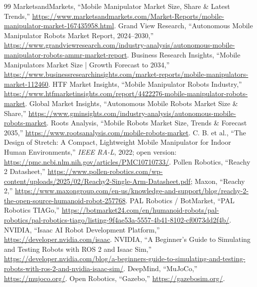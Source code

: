 \documentclass[11pt,a4paper]{article}
\begin{document}
\begin{thebibliography}{99}\small
{} MarketsandMarkets, ``Mobile Manipulator Market Size, Share \& Latest Trends,'' \url{https://www.marketsandmarkets.com/Market-Reports/mobile-manipulator-market-167435958.html}.
 Grand View Research, ``Autonomous Mobile Manipulator Robots Market Report, 2024--2030,'' \url{https://www.grandviewresearch.com/industry-analysis/autonomous-mobile-manipulator-robots-ammr-market-report}.
 Business Research Insights, ``Mobile Manipulators Market Size | Growth Forecast to 2034,'' \url{https://www.businessresearchinsights.com/market-reports/mobile-manipulators-market-112460}.
 HTF Market Insights, ``Mobile Manipulator Robots Industry,'' \url{https://www.htfmarketinsights.com/report/4422276-mobile-manipulator-robots-market}.
 Global Market Insights, ``Autonomous Mobile Robots Market Size \& Share,'' \url{https://www.gminsights.com/industry-analysis/autonomous-mobile-robots-market}.
 Roots Analysis, ``Mobile Robots Market Size, Trends \& Forecast 2035,'' \url{https://www.rootsanalysis.com/mobile-robots-market}.
 C. B. et al., ``The Design of Stretch: A Compact, Lightweight Mobile Manipulator for Indoor Human Environments,'' \emph{IEEE RA-L}, 2022; open version: \url{https://pmc.ncbi.nlm.nih.gov/articles/PMC10710733/}.
 Pollen Robotics, ``Reachy 2 Datasheet,'' \url{https://www.pollen-robotics.com/wp-content/uploads/2025/02/Reachy2-Single-Arm-Datasheet.pdf}; Maxon, ``Reachy 2,'' \url{https://www.maxongroup.com/en-us/knowledge-and-support/blog/reachy-2-the-open-source-humanoid-robot-257768}.
 PAL Robotics / BotMarket, ``PAL Robotics TIAGo,'' \url{https://botmarket24.com/en/humanoid-robots/pal-robotics/pal-robotics-tiago/listing-9f4ae53a-5557-4b41-8102-cf0073dd2f4b/}.
 NVIDIA, ``Isaac AI Robot Development Platform,'' \url{https://developer.nvidia.com/isaac}.
 NVIDIA, ``A Beginner's Guide to Simulating and Testing Robots with ROS 2 and Isaac Sim,'' \url{https://developer.nvidia.com/blog/a-beginners-guide-to-simulating-and-testing-robots-with-ros-2-and-nvidia-isaac-sim/}.
 DeepMind, ``MuJoCo,'' \url{https://mujoco.org/}.
 Open Robotics, ``Gazebo,'' \url{https://gazebosim.org/}.
\end{thebibliography}
\end{document}

